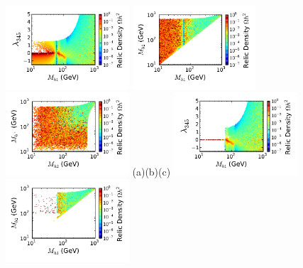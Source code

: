 \begin{figure}[htb]
\vskip -1.0cm
\hspace*{-0.3cm}\includegraphics[width=0.41\textwidth]{Figures/Mh1_ld345_Omega_large-cut12.pdf}%
\hspace*{-1.78cm}\includegraphics[width=0.41\textwidth]{Figures/Mh1_Mh2_Omega_large-cut12.pdf}%
\hspace*{-1.77cm}\includegraphics[width=0.41\textwidth]{Figures/Mhc_Mh2_Omega_large-cut12.pdf}%
\vskip -1.1cm
\hspace*{1.2cm}(a)\hspace*{0.35\textwidth}\hspace*{-1.3cm}(b)\hspace*{0.35\textwidth}\hspace*{-1.2cm}(c)
\vskip 0.0cm
{\hspace*{-0.3cm}\includegraphics[width=0.41\textwidth]{Figures/Mh1_ld345_Omega_large-cut123456.pdf}}%
{\hspace*{-1.78cm}\includegraphics[width=0.41\textwidth]{Figures/Mh1_Mh2_Omega_large-cut123456.pdf}}%

\end{figure}
